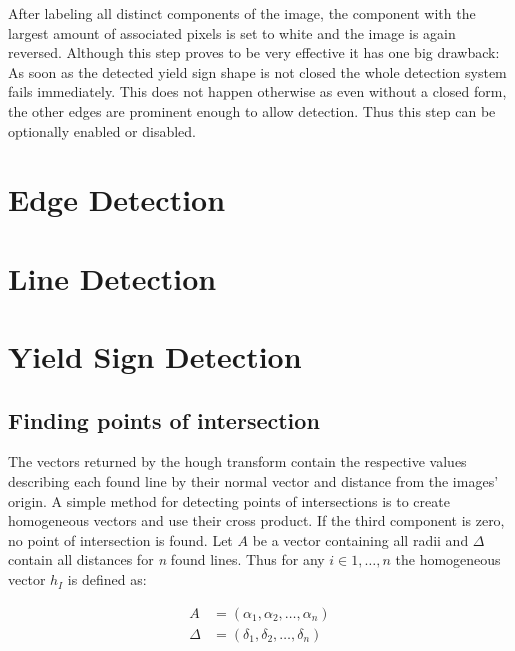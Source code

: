 \documentclass{report}
\begin{document}
After labeling all distinct components of the image, the component
with the largest amount of associated pixels is set to white and the
image is again reversed. Although this step proves to be very
effective it has one big drawback: As soon as the detected yield sign
shape is not closed the whole detection system fails immediately. This
does not happen otherwise as even without a closed form, the other
edges are prominent enough to allow detection. Thus this step can be
optionally enabled or disabled.

{\color{red}{Picture examples}}


\section{Edge Detection}
{\color{red}{To be written}}


\section{Line Detection}
{\color{red}{To be written}}


\section{Yield Sign Detection}
{\color{red}{To be written}}


\subsection{Finding points of intersection}

The vectors returned by the hough transform contain the respective
values describing each found line by their normal vector and distance
from the images' origin. A simple method for detecting points of
intersections is to create homogeneous vectors and use their cross
product. If the third component is zero, no point of intersection is
found. Let \( A \) be a vector containing all radii and \( \Delta \)
contain all distances for \textit{n} found lines. Thus for any \( i
\in 1, \dots, n \) the homogeneous vector \( h_I \) is defined as:

\begin{equation}
  \begin{split}
    A & = (\alpha_1, \alpha_2, \dots, \alpha_n) \\
    \Delta & = (\delta_1, \delta_2, \dots, \delta_n)
  \end{split}
\end{equation}
\end{document}
